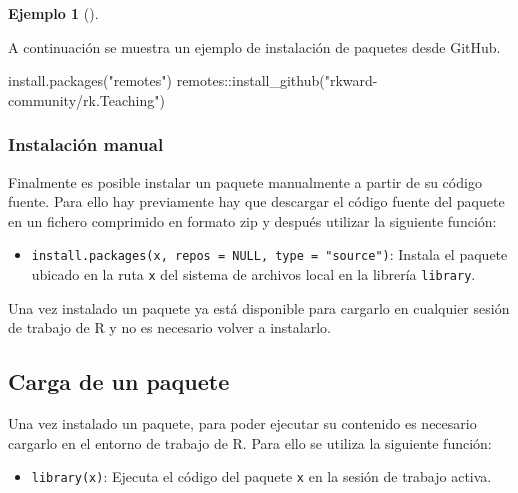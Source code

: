 \documentclass[
  a4paper,
]{scrreport}
\newenvironment{Shaded}{\begin{snugshade}}{\end{snugshade}}
\newcommand{\FunctionTok}[1]{\textcolor[rgb]{0.28,0.35,0.67}{#1}}
\newcommand{\NormalTok}[1]{\textcolor[rgb]{0.00,0.23,0.31}{#1}}
\newcommand{\SpecialCharTok}[1]{\textcolor[rgb]{0.37,0.37,0.37}{#1}}
\newcommand{\StringTok}[1]{\textcolor[rgb]{0.13,0.47,0.30}{#1}}
\providecommand{\tightlist}{%
  \setlength{\itemsep}{0pt}\setlength{\parskip}{0pt}}\usepackage{longtable,booktabs,array}
\theoremstyle{definition}
\theoremstyle{definition}
\newtheorem{example}{Ejemplo}[chapter]
\theoremstyle{remark}
\begin{document}
\leavevmode{}%
\begin{example}[]\label{exm-instalacion-paquetes-github}

A continuación se muestra un ejemplo de instalación de paquetes desde
GitHub.

\begin{Shaded}
\begin{Highlighting}[]
\FunctionTok{install.packages}\NormalTok{(}\StringTok{"remotes"}\NormalTok{)}
\NormalTok{remotes}\SpecialCharTok{::}\FunctionTok{install\_github}\NormalTok{(}\StringTok{"rkward{-}community/rk.Teaching"}\NormalTok{)}
\end{Highlighting}
\end{Shaded}

\end{example}

\hypertarget{instalaciuxf3n-manual}{%
\subsubsection{Instalación manual}\label{instalaciuxf3n-manual}}

Finalmente es posible instalar un paquete manualmente a partir de su
código fuente. Para ello hay previamente hay que descargar el código
fuente del paquete en un fichero comprimido en formato zip y después
utilizar la siguiente función:

\begin{itemize}
\tightlist
\item
  \texttt{install.packages(x,\ repos\ =\ NULL,\ type\ =\ "source")}:
  Instala el paquete ubicado en la ruta \texttt{x} del sistema de
  archivos local en la librería \texttt{library}.
\end{itemize}

Una vez instalado un paquete ya está disponible para cargarlo en
cualquier sesión de trabajo de R y no es necesario volver a instalarlo.

\hypertarget{carga-de-un-paquete}{%
\subsection{Carga de un paquete}\label{carga-de-un-paquete}}

Una vez instalado un paquete, para poder ejecutar su contenido es
necesario cargarlo en el entorno de trabajo de R. Para ello se utiliza
la siguiente función:

\begin{itemize}
\tightlist
\item
  \texttt{library(x)}: Ejecuta el código del paquete \texttt{x} en la
  sesión de trabajo activa.
\end{itemize}
\end{document}
